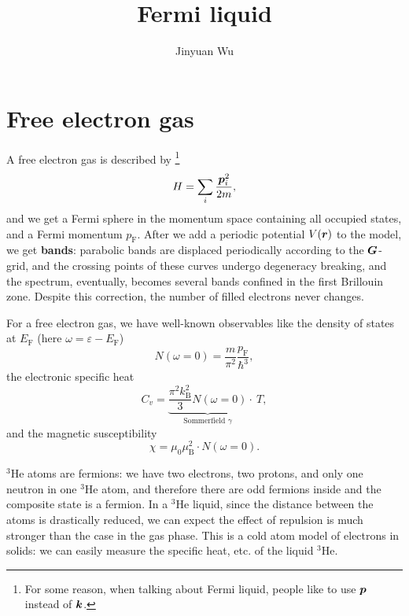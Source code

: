 \documentclass[hyperref, a4paper]{article}
\title{Fermi liquid}
\author{Jinyuan Wu}
\newcommand*{\concept}[1]{{\textbf{#1}}}
\newcommand*{\kB}{k_{\text{B}}}
\newcommand*{\muB}{\mu_{\text{B}}}
\newcommand*{\efermi}{E_{\text{F}}}
\newcommand*{\pfermi}{p_{\text{F}}}
\newcommand*{\hethree}{$^3$He}
\begin{document}
\maketitle

\section{Free electron gas}

A free electron gas is described by%
\footnote{
    For some reason, 
    when talking about Fermi liquid, 
    people like to use $\vb*{p}$ instead of $\vb*{k}$.
}
\begin{equation}
    H = \sum_i \frac{\vb*{p}_i^2}{2m},
\end{equation}
and we get a Fermi sphere in the momentum space 
containing all occupied states, 
and a Fermi momentum $\pfermi$.
After we add a periodic potential $V(\vb*{r})$ to the model, 
we get \concept{bands}: 
parabolic bands are displaced periodically 
according to the $\vb*{G}$-grid, 
and the crossing points of these curves 
undergo degeneracy breaking,
and the spectrum, eventually, 
becomes several bands confined in the first Brillouin zone. 
Despite this correction, 
the number of filled electrons never changes.

For a free electron gas, we have well-known observables like 
the density of states at $\efermi$ 
(here $\omega = \varepsilon - \efermi$)
\begin{equation}
    N(\omega = 0) = \frac{m}{\pi^2} \frac{\pfermi}{\hbar^3}, 
    \label{eq:free-electron.dos}
\end{equation}
the electronic specific heat 
\begin{equation}
    C_v = \underbrace{\frac{\pi^2 \kB^2}{3} N(\omega = 0)}_{\text{Sommerfield $\gamma$}} \cdot \ T, 
    \label{eq:free-electron.specific-heat}
\end{equation}
and the magnetic susceptibility 
\begin{equation}
    \chi = \mu_0  \muB^2 \cdot N(\omega = 0).
\end{equation}

\hethree{} atoms are fermions: 
we have two electrons, two protons, and only one neutron
in one \hethree{} atom, 
and therefore there are odd fermions inside 
and the composite state is a fermion. 
In a \hethree{} liquid, 
since the distance between the atoms is drastically reduced, 
we can expect the effect of repulsion is much stronger 
than the case in the gas phase. 
This is a cold atom model of electrons in solids: 
we can easily measure the specific heat, etc. 
of the liquid \hethree.
\end{document}
